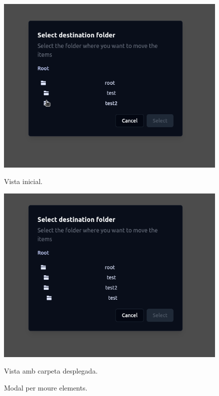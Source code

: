 \begin{figure}[H]
    \centering
    \begin{minipage}{0.48\textwidth}
        \centering
        \includegraphics[width=\linewidth]{Figures/ui-web/move_dialog.png}
        \caption{Vista inicial.}
    \end{minipage}\hfill
    \begin{minipage}{0.48\textwidth}
        \centering
        \includegraphics[width=\linewidth]{Figures/ui-web/move_dialog_afterclick.png}
        \caption{Vista amb carpeta desplegada.}
    \end{minipage}
    \caption{Modal per moure elements.}
    \label{fig:react-move-impl}
\end{figure}

